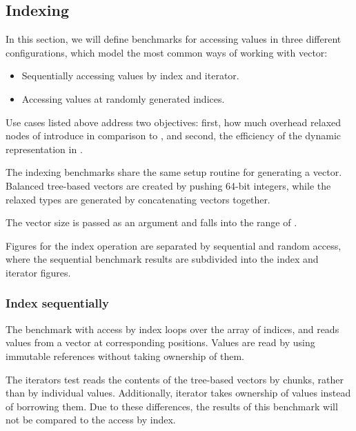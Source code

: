 \subsection{Indexing}
In this section, we will define benchmarks for accessing values in three different configurations, which model the most common ways of working with vector:

\begin{itemize}
    \item Sequentially accessing values by index and iterator.
    \item Accessing values at randomly generated indices.
\end{itemize}

Use cases listed above address two objectives: first, how much overhead relaxed nodes of \rrbtree{} introduce in comparison to \rbtree{}, and second, the efficiency of the dynamic representation in \pvec{}.

The indexing benchmarks share the same setup routine for generating a vector. Balanced tree-based vectors are created by pushing 64-bit integers, while the relaxed types are generated by concatenating vectors together.

The vector size is passed as an argument and falls into the range of \range{[20, \mega{1}]}.

Figures for the index operation are separated by sequential and random access, where the sequential benchmark results are subdivided into the index and iterator figures.

\subsubsection*{Index sequentially}
The benchmark with access by index loops over the array of \range{[0, N)} indices, and reads values from a vector at corresponding positions. Values are read by using immutable references without taking ownership of them.

The iterators test reads the contents of the tree-based vectors by chunks, rather than by individual values. Additionally, iterator takes ownership of values instead of borrowing them. Due to these differences, the results of this benchmark will not be compared to the access by index.

